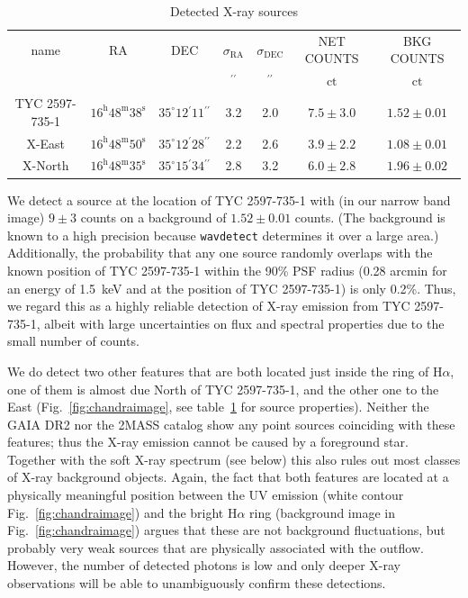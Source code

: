 \documentclass[linenumbers]{aastex631}
\begin{document}
\begin{table}
\caption{Detected X-ray sources\label{tab:src}}
\begin{tabular}{ccccccc}
\hline \hline
name & RA & DEC & $\sigma_\mathrm{RA}$ & $\sigma_\mathrm{DEC}$ & NET COUNTS & BKG COUNTS\\
 &  &  & $\mathrm{{}^{\prime\prime}}$ & $\mathrm{{}^{\prime\prime}}$ & $\mathrm{ct}$ & $\mathrm{ct}$ \\
\hline
TYC 2597-735-1 & $16^\mathrm{h}48^\mathrm{m}38^\mathrm{s}$ & $35^\circ12{}^\prime11{}^{\prime\prime}$ & 3.2 & 2.0 & $7.5 \pm 3.0$ & $1.52 \pm 0.01 $\\
X-East & $16^\mathrm{h}48^\mathrm{m}50^\mathrm{s}$ & $35^\circ12{}^\prime28{}^{\prime\prime}$ & 2.2 & 2.6 & $3.9 \pm 2.2$ & $1.08 \pm 0.01 $\\
X-North & $16^\mathrm{h}48^\mathrm{m}35^\mathrm{s}$ & $35^\circ15{}^\prime34{}^{\prime\prime}$ & 2.8 & 3.2 & $6.0 \pm 2.8$ & $1.96 \pm 0.02$ \\
\hline
\end{tabular}
\end{table}


We detect a source at the location of TYC 2597-735-1 with (in our narrow band image) $9\pm3$ counts on a background of $1.52\pm0.01$ counts. (The background is known to a high precision because \texttt{wavdetect} determines it over a large area.) Additionally, the probability that any one source randomly overlaps with the known position of TYC 2597-735-1 within the 90\% PSF radius (0.28 arcmin for an energy of 1.5~keV and at the position of TYC 2597-735-1) is only 0.2\%. Thus, we regard this as a highly reliable detection of X-ray emission from TYC 2597-735-1, albeit with large uncertainties on flux and spectral properties due to the small number of counts.

We do detect two other features that are both located just inside the ring of H$\alpha$, one of them is almost due North of TYC 2597-735-1, and the other one to the East (Fig.~\ref{fig:chandraimage}, see table~\ref{tab:src} for source properties).  Neither the GAIA DR2 \citep{2016A&A...595A...1G,2018A&A...616A...1G} nor the 2MASS \citep{2006AJ....131.1163S} catalog show any point sources coinciding with these features; thus the X-ray emission cannot be caused by a foreground star. Together with the soft X-ray spectrum (see below) this also rules out most classes of X-ray background objects. Again, the fact that both features are located at a physically meaningful position between the UV emission (white contour Fig.~\ref{fig:chandraimage}) and the bright H$\alpha$ ring (background image in Fig.~\ref{fig:chandraimage}) argues that these are not background fluctuations, but probably very weak sources that are physically associated with the outflow. However, the number of detected photons is low and only deeper X-ray observations will be able to unambiguously confirm these detections.
\end{document}
